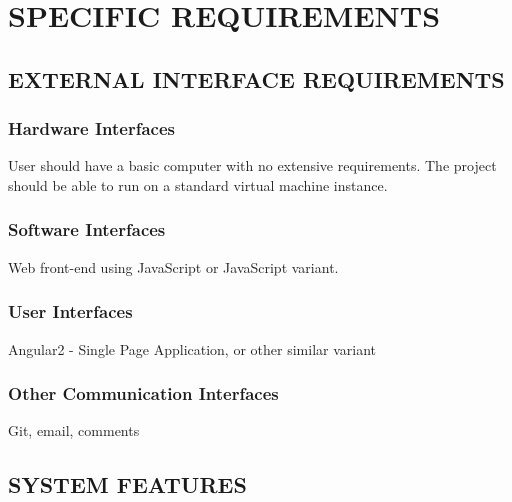 \documentclass[letterpaper, 10pt, draftclsnofoot, compsoc, onecolumn]{IEEEtran}
\begin{document}
{{\clearpage


\section[SPECIFIC REQUIREMENTS]{\rmfamily\bfseries\color{black} SPECIFIC REQUIREMENTS}


\subsection[EXTERNAL INTERFACE REQUIREMENTS]{\rmfamily\bfseries\color{black} EXTERNAL INTERFACE REQUIREMENTS}

\subsubsection[Hardware Interfaces]{\rmfamily\bfseries\color{black} Hardware Interfaces}
{\noindent 
User should have a basic computer 
with no extensive requirements. The project should be able to run on a standard virtual machine 
instance.}

\subsubsection[Software Interfaces]{\rmfamily\bfseries\color{black} Software Interfaces}
{\noindent 
Web front-end using JavaScript or JavaScript variant.}

\subsubsection[User Interfaces]{\rmfamily\bfseries\color{black} User Interfaces}
{\noindent 
Angular2 - Single Page Application, or other similar variant}

\subsubsection[Other Communication Interfaces]{\rmfamily\bfseries\color{black} Other Communication Interfaces}
{\noindent 
Git, email, comments}


\bigskip

\clearpage
\subsection[SYSTEM FEATURES]{\rmfamily\bfseries\color{black} SYSTEM FEATURES}


}}
\end{document}

